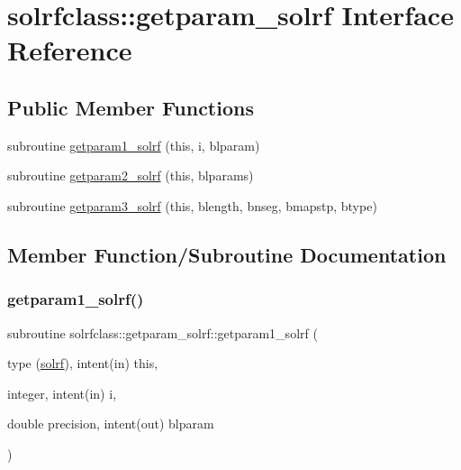 \hypertarget{interfacesolrfclass_1_1getparam__solrf}{}\section{solrfclass\+::getparam\+\_\+solrf Interface Reference}
\label{interfacesolrfclass_1_1getparam__solrf}
\subsection*{Public Member Functions}
\begin{DoxyCompactItemize}
\item 
subroutine \mbox{\hyperlink{interfacesolrfclass_1_1getparam__solrf_aad42552200ad6dddf310d36ca5fe5229}{getparam1\+\_\+solrf}} (this, i, blparam)
\item 
subroutine \mbox{\hyperlink{interfacesolrfclass_1_1getparam__solrf_a894679e72c2fec5d213c1e22bcada11f}{getparam2\+\_\+solrf}} (this, blparams)
\item 
subroutine \mbox{\hyperlink{interfacesolrfclass_1_1getparam__solrf_aadb158194b1a47f87f42e77f748356bb}{getparam3\+\_\+solrf}} (this, blength, bnseg, bmapstp, btype)
\end{DoxyCompactItemize}


\subsection{Member Function/\+Subroutine Documentation}
\mbox{\label{interfacesolrfclass_1_1getparam__solrf_aad42552200ad6dddf310d36ca5fe5229}} 
\subsubsection{\texorpdfstring{getparam1\_solrf()}{getparam1\_solrf()}}
{\footnotesize\ttfamily subroutine solrfclass\+::getparam\+\_\+solrf\+::getparam1\+\_\+solrf (\begin{DoxyParamCaption}\item[{type (\mbox{\hyperlink{namespacesolrfclass_structsolrfclass_1_1solrf}{solrf}}), intent(in)}]{this,  }\item[{integer, intent(in)}]{i,  }\item[{double precision, intent(out)}]{blparam }\end{DoxyParamCaption})}


